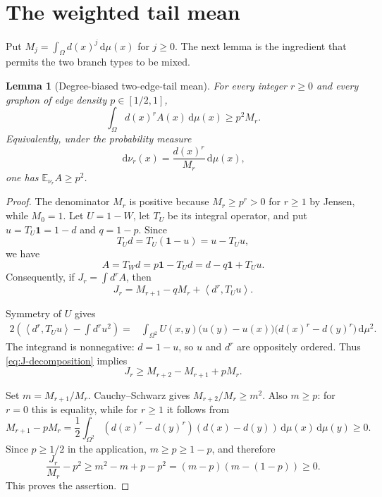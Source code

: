 \documentclass[11pt]{article}
\newtheorem{lemma}[theorem]{Lemma}
\newcommand{\dd}{\,\mathrm d}
\newcommand{\ip}[2]{\left\langle #1,#2\right\rangle}
\begin{document}
\section{The weighted tail mean}

Put $M_j=\int_\Omega d(x)^j\dd\mu(x)$ for $j\geq0$.  The next lemma is the
ingredient that permits the two branch types to be mixed.

\begin{lemma}[Degree-biased two-edge-tail mean]
\label{lem:biased-tail}
For every integer $r\geq0$ and every graphon of edge density
$p\in[1/2,1]$,
\[
 \int_\Omega d(x)^rA(x)\dd\mu(x)\geq p^2M_r.
\]
Equivalently, under the probability measure
\[
 \dd\nu_r(x)=\frac{d(x)^r}{M_r}\dd\mu(x),
\]
one has $\mathbb E_{\nu_r}A\geq p^2$.
\end{lemma}

\begin{proof}
The denominator $M_r$ is positive because $M_r\geq p^r>0$ for $r\geq1$
by Jensen, while $M_0=1$.  Let $U=1-W$, let $T_U$ be its integral operator,
and put $u=T_U\mathbf1=1-d$ and $q=1-p$.  Since
\[
 T_Ud=T_U(\mathbf1-u)=u-T_Uu,
\]
we have
\[
 A=T_Wd=p\mathbf1-T_Ud=d-q\mathbf1+T_Uu.
\]
Consequently, if $J_r=\int d^rA$, then
\begin{equation}
 J_r=M_{r+1}-qM_r+\ip{d^r}{T_Uu}.
 \label{eq:J-decomposition}
\end{equation}

Symmetry of $U$ gives
\begin{align*}
 2\left(\ip{d^r}{T_Uu}-\int d^ru^2\right)
 ={}&\int_{\Omega^2}U(x,y)
 \bigl(u(y)-u(x)\bigr)
 \bigl(d(x)^r-d(y)^r\bigr)\dd\mu^2.
\end{align*}
The integrand is nonnegative: $d=1-u$, so $u$ and $d^r$ are oppositely
ordered.  Thus \eqref{eq:J-decomposition} implies
\begin{equation}
 J_r\geq M_{r+2}-M_{r+1}+pM_r.
 \label{eq:J-moments}
\end{equation}

Set $m=M_{r+1}/M_r$.  Cauchy--Schwarz gives
$M_{r+2}/M_r\geq m^2$.  Also $m\geq p$: for $r=0$ this is equality, while
for $r\geq1$ it follows from
\[
 M_{r+1}-pM_r
 =\frac12\int_{\Omega^2}
 (d(x)^r-d(y)^r)(d(x)-d(y))\dd\mu(x)\dd\mu(y)\geq0.
\]
Since $p\geq1/2$ in the application, $m\geq p\geq1-p$, and therefore
\[
 \frac{J_r}{M_r}-p^2
 \geq m^2-m+p-p^2
 =(m-p)(m-(1-p))\geq0.
\]
This proves the assertion.
\end{proof}
\end{document}

